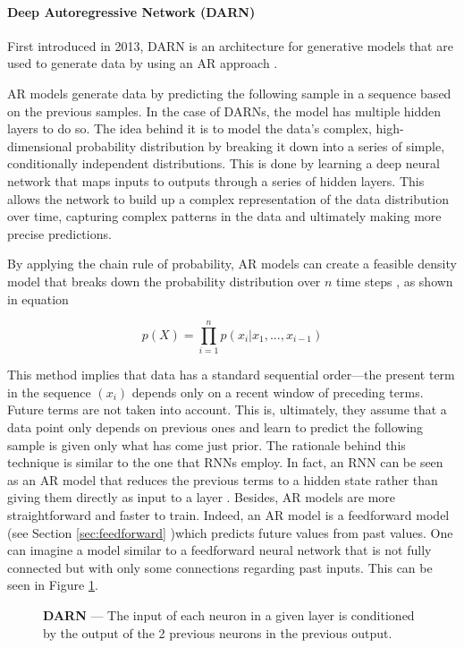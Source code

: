\paragraph{Deep Autoregressive Network (DARN)} \label{sec:darn}

First introduced in 2013, \acf{DARN} is an architecture for generative models that are used to generate data by using an \acf{AR} approach \cite{gregor_deep_2014}.

\Ac{AR} models generate data by predicting the following sample in a sequence based on the previous samples. In the case of \acp{DARN}, the model has multiple hidden layers to do so. The idea behind it is to model the data's complex, high-dimensional probability distribution by breaking it down into a series of simple, conditionally independent distributions. This is done by learning a deep neural network that maps inputs to outputs through a series of hidden layers. This allows the network to build up a complex representation of the data distribution over time, capturing complex patterns in the data and ultimately making more precise predictions.

By applying the chain rule of probability, \ac{AR} models can create a feasible density model that breaks down the probability distribution over $n$ time steps \cite{huzaifah_deep_2021}, as shown in equation

\begin{equation} \label{eq:chain-rule}
    p(X) = \prod_{i=1}^n p(x_i|x_1, ..., x_{i-1})
\end{equation}

This method implies that data has a standard sequential order—the present term in the sequence $(x_i)$ depends only on a recent window of preceding terms. Future terms are not taken into account. This is, ultimately, they assume that a data point only depends on previous ones and learn to predict the following sample is given only what has come just prior. The rationale behind this technique is similar to the one that \acp{RNN} employ. In fact, an \ac{RNN} can be seen as an \ac{AR} model that reduces the previous terms to a hidden state rather than giving them directly as input to a layer \cite{huzaifah_deep_2021}. Besides, \ac{AR} models are more straightforward and faster to train. Indeed, an \ac{AR} model is a feedforward model (see Section \ref{sec:feedforward} )which predicts future values from past values. One can imagine a model similar to a feedforward neural network that is not fully connected but with only some connections regarding past inputs. This can be seen in Figure \ref{fig:darn}.

\begin{figure}[ht]
    \centering
    \caption[Deep autoregressive network]{\textbf{\Acf{DARN}} --- The input of each neuron in a given layer is conditioned by the output of the 2 previous neurons in the previous output.}
    \label{fig:darn}
\end{figure}